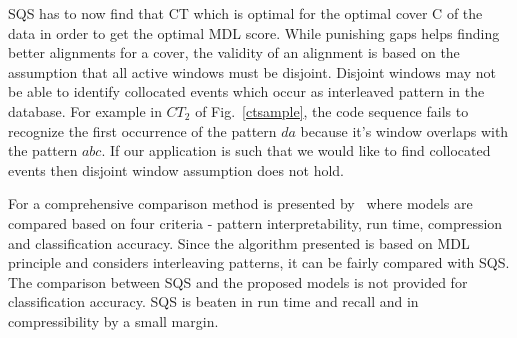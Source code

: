 \documentclass[10pt]{article}
\begin{document}
\par SQS has to now find that CT which is optimal for the optimal cover C of the data in order to get the optimal MDL score. While punishing gaps helps finding better alignments for a cover, the validity of an alignment is based on the assumption that all active windows must be disjoint. Disjoint windows may not be able to identify collocated events which occur as interleaved pattern in the database. For example in $CT_2$ of Fig.~\ref{ctsample}, the code sequence fails to recognize the first occurrence of the pattern $da$ because it's window overlaps with the pattern $abc$. If our application is such that we would like to find collocated events then disjoint window assumption does not hold.

\par For a comprehensive comparison method is presented by~\citet{lam2014mining} where models are compared based on four criteria - pattern interpretability, run time, compression and classification accuracy. Since the algorithm presented is based on MDL principle and considers interleaving patterns, it can be fairly compared with SQS. The comparison between SQS and the proposed models is not provided for classification accuracy. SQS is beaten in run time and recall and in compressibility by a small margin.  
\end{document}
